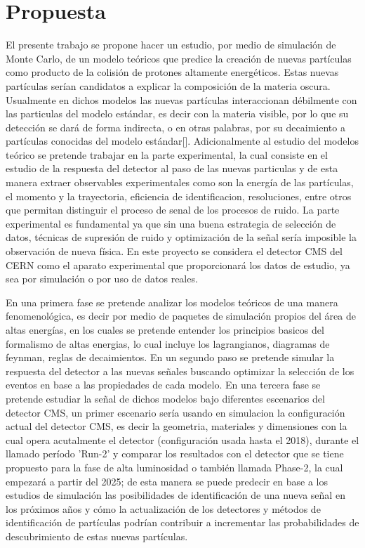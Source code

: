 \chapter{Propuesta}

El presente trabajo se propone hacer un estudio, por medio de simulación de Monte Carlo, de un modelo teóricos que predice la creación de nuevas partículas como producto de la colisión de protones altamente energéticos. Estas nuevas partículas serían candidatos a explicar la composición de la materia oscura. Usualmente en dichos modelos las nuevas partículas interaccionan débilmente con las particulas del modelo estándar, es decir con la materia visible, por lo que su detección se dará de forma indirecta, o en otras palabras, por su decaimiento a partículas conocidas del modelo estándar[]. Adicionalmente al estudio del modelos teórico se pretende trabajar en la parte experimental, la cual consiste en el estudio de la respuesta del detector al paso de las nuevas particulas y de esta manera extraer observables experimentales como son la energía de las partículas, el momento y la trayectoria, eficiencia de identificacion, resoluciones, entre otros que permitan distinguir el proceso de senal de los procesos de ruido. La parte experimental es fundamental ya que sin una buena estrategia de selección de datos, técnicas de supresión de ruido y optimización de la señal sería imposible la observación de nueva física. En este proyecto se considera el detector CMS del CERN como el aparato experimental que proporcionará los datos de estudio, ya sea por simulación o por uso de datos reales.

En una primera fase se pretende analizar los modelos teóricos de una manera fenomenológica, es decir por medio de paquetes de simulación propios del área de altas energías, en los cuales se pretende entender los principios basicos del formalismo de altas energias, lo cual incluye los lagrangianos, diagramas de feynman, reglas de decaimientos. En un segundo paso se pretende simular la respuesta del detector a las nuevas señales buscando optimizar la selección de los eventos en base a las propiedades de cada modelo. En una tercera fase se pretende estudiar la señal de dichos modelos bajo diferentes escenarios del detector CMS, un primer escenario sería usando en simulacion la configuración actual del detector CMS, es decir la geometria, materiales y dimensiones con la cual opera acutalmente el detector (configuración usada hasta el 2018), durante el llamado período 'Run-2' y comparar los resultados con el detector que se tiene propuesto para la fase de alta luminosidad o también llamada Phase-2, la cual empezará a partir del 2025; de esta manera se puede predecir en base a los estudios de simulación las posibilidades de identificación de una nueva señal en los próximos años y cómo la actualización de los detectores y métodos de identificación de partículas podrían contribuir a incrementar las probabilidades de descubrimiento de estas nuevas partículas.




